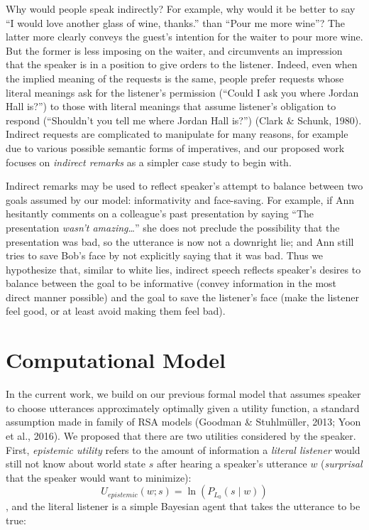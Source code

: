 \documentclass[10pt, letterpaper]{article}
\begin{document}
Why would people speak indirectly? For example, why would it be better
to say ``I would love another glass of wine, thanks.'' than ``Pour me
more wine''? The latter more clearly conveys the guest's intention for
the waiter to pour more wine. But the former is less imposing on the
waiter, and circumvents an impression that the speaker is in a position
to give orders to the listener. Indeed, even when the implied meaning of
the requests is the same, people prefer requests whose literal meanings
ask for the listener's permission (``Could I ask you where Jordan Hall
is?'') to those with literal meanings that assume listener's obligation
to respond (``Shouldn't you tell me where Jordan Hall is?'') (Clark \&
Schunk, 1980). Indirect requests are complicated to manipulate for many
reasons, for example due to various possible semantic forms of
imperatives, and our proposed work focuses on \emph{indirect remarks} as
a simpler case study to begin with.

Indirect remarks may be used to reflect speaker's attempt to balance
between two goals assumed by our model: informativity and face-saving.
For example, if Ann hesitantly comments on a colleague's past
presentation by saying ``The presentation \emph{wasn't
amazing}\ldots{}'' she does not preclude the possibility that the
presentation was bad, so the utterance is now not a downright lie; and
Ann still tries to save Bob's face by not explicitly saying that it was
bad. Thus we hypothesize that, similar to white lies, indirect speech
reflects speaker's desires to balance between the goal to be informative
(convey information in the most direct manner possible) and the goal to
save the listener's face (make the listener feel good, or at least avoid
making them feel bad).

\section{Computational Model}\label{computational-model}

In the current work, we build on our previous formal model that assumes
speaker to choose utterances approximately optimally given a utility
function, a standard assumption made in family of RSA models (Goodman \&
Stuhlmüller, 2013; Yoon et al., 2016). We proposed that there are two
utilities considered by the speaker. First, \emph{epistemic utility}
refers to the amount of information a \emph{literal listener} would
still not know about world state \(s\) after hearing a speaker's
utterance \(w\) (\emph{surprisal} that the speaker would want to
minimize): \[U_{epistemic}(w; s) = \ln(P_{L_0}(s \mid w))\], and the
literal listener is a simple Bayesian agent that takes the utterance to
be true:
\end{document}

